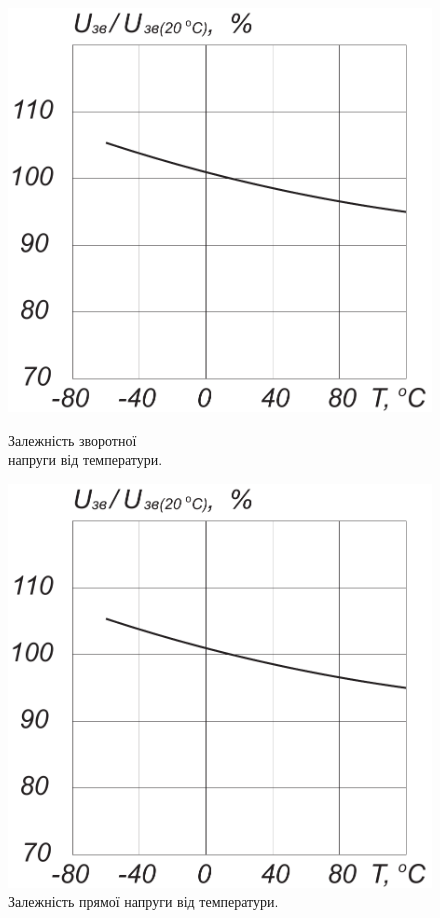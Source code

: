 \documentclass[a4paper,14pt]{extreport}
\begin{document}
\begin{figure}[h!]\label{im8}
  \begin{minipage}[h]{0.5\linewidth}
    \includegraphics[width=1\linewidth]{1.5.4.pdf}
    \caption{Залежність зворотної\\ напруги від температури.}
  \end{minipage}
\hfill
  \begin{minipage}[h]{0.5\linewidth}
    \includegraphics[width=1\linewidth]{1.5.4.pdf}
    \caption{Залежність прямої напруги від температури.}
  \end{minipage}
\end{figure}
\end{document}
